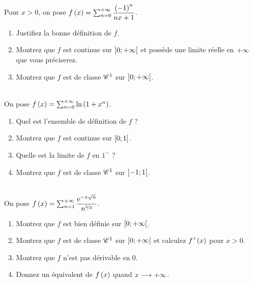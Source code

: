 \begin{exoss}
Pour \(x>0\), on pose \(f\left(x\right)=\sum_{n=0}^{+\infty}\dfrac{\left(-1\right)^n}{nx+1}\).

\begin{enumerate}
    \item Justifiez la bonne définition de \(f\). \\
    \item Montrez que \(f\) est continue sur \(\left]0;+\infty\right[\) et possède une limite réelle en \(+\infty\) que vous préciserez. \\
    \item Montrez que \(f\) est de classe \(\mathscr{C}^{1}\) sur \(\left]0;+\infty\right[\).
\end{enumerate}
\end{exoss}

\begin{exoss}~\\
On pose \(f\left(x\right)=\sum_{n=0}^{+\infty}\ln\left(1+x^n\right)\).

\begin{enumerate}
    \item Quel est l'ensemble de définition de \(f\) ? \\
    \item Montrez que \(f\) est continue sur \(\left[0;1\right[\). \\
    \item Quelle est la limite de \(f\) en \(1^-\) ? \\
    \item Montrez que \(f\) est de classe \(\mathscr{C}^{1}\) sur \(\left]-1;1\right[\).
\end{enumerate}
\end{exoss}

\begin{exoss}~\\
On pose \(f\left(x\right)=\sum_{n=1}^{+\infty}\dfrac{\mathrm{e}^{-x\sqrt{n}}}{n^{\nicefrac{3}{2}}}\).

\begin{enumerate}
    \item Montrez que \(f\) est bien définie sur \(\left[0;+\infty\right[\). \\
    \item Montrez que \(f\) est de classe \(\mathscr{C}^{1}\) sur \(\left]0;+\infty\right[\) et calculez \(f^{\,\prime}\left(x\right)\) pour \(x>0\). \\
    \item Montrez que \(f\) n'est pas dérivable en \(0\). \\
    \item Donnez un équivalent de \(f\left(x\right)\) quand \(x\longrightarrow+\infty\).
\end{enumerate}
\end{exoss}

